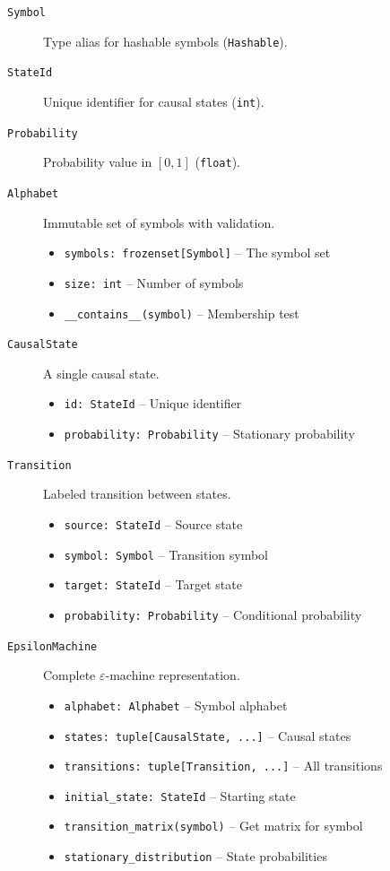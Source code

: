 \documentclass[11pt,a4paper]{report}
\theoremstyle{definition}
\theoremstyle{plain}
\newcommand{\eps}{\varepsilon}
\begin{document}
\begin{description}
    \item[\texttt{Symbol}] Type alias for hashable symbols (\texttt{Hashable}).

    \item[\texttt{StateId}] Unique identifier for causal states (\texttt{int}).

    \item[\texttt{Probability}] Probability value in $[0, 1]$ (\texttt{float}).

    \item[\texttt{Alphabet}] Immutable set of symbols with validation.
        \begin{itemize}
            \item \texttt{symbols: frozenset[Symbol]} -- The symbol set
            \item \texttt{size: int} -- Number of symbols
            \item \texttt{\_\_contains\_\_(symbol)} -- Membership test
        \end{itemize}

    \item[\texttt{CausalState}] A single causal state.
        \begin{itemize}
            \item \texttt{id: StateId} -- Unique identifier
            \item \texttt{probability: Probability} -- Stationary probability
        \end{itemize}

    \item[\texttt{Transition}] Labeled transition between states.
        \begin{itemize}
            \item \texttt{source: StateId} -- Source state
            \item \texttt{symbol: Symbol} -- Transition symbol
            \item \texttt{target: StateId} -- Target state
            \item \texttt{probability: Probability} -- Conditional probability
        \end{itemize}

    \item[\texttt{EpsilonMachine}] Complete $\eps$-machine representation.
        \begin{itemize}
            \item \texttt{alphabet: Alphabet} -- Symbol alphabet
            \item \texttt{states: tuple[CausalState, ...]} -- Causal states
            \item \texttt{transitions: tuple[Transition, ...]} -- All transitions
            \item \texttt{initial\_state: StateId} -- Starting state
            \item \texttt{transition\_matrix(symbol)} -- Get matrix for symbol
            \item \texttt{stationary\_distribution} -- State probabilities
        \end{itemize}
\end{description}
\end{document}
